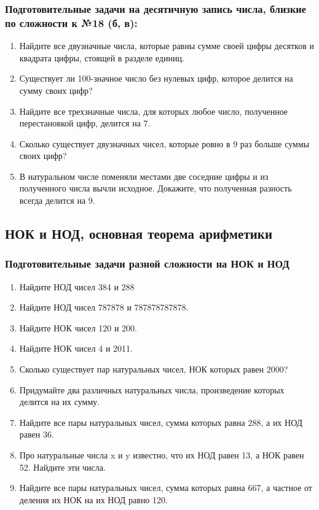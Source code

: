 \documentclass[12pt]{article}
\begin{document}
\subsubsection*{Подготовительные задачи на десятичную запись числа, близкие по сложности к №18 (б, в):}
 \begin{enumerate}[start=1,label={\itshape\bfseries \arabic*.}]
	\item Найдите все двузначные числа, которые равны сумме своей цифры десятков и квадрата цифры, стоящей в разделе единиц.
	\item Существует ли 100-значное число без нулевых цифр, которое делится на сумму своих цифр?
	\item Найдите все трехзначные числа, для которых любое число, полученное перестановкой цифр, делится на 7.
	\item Сколько существует двузначных чисел, которые ровно в 9 раз больше суммы своих цифр?
	\item В натуральном числе поменяли местами две соседние цифры и из полученного числа вычли исходное. Докажите, что полученная разность всегда делится на 9.
\end{enumerate}







\subsection{НОК и НОД, основная теорема арифметики}

\subsubsection*{Подготовительные задачи разной сложности на НОК и НОД}
 \begin{enumerate}[start=1,label={\itshape\bfseries \arabic*.}]
	\item Найдите НОД чисел 384 и 288
	\item Найдите НОД чисел 787878 и 787878787878.
	\item Найдите НОК чисел 120 и 200.
	\item Найдите НОК чисел 4 и 2011.
	\item Сколько существует пар натуральных чисел, НОК которых равен 2000?
	\item Придумайте два различных натуральных числа, произведение которых делится на их сумму.
	\item Найдите все пары натуральных чисел, сумма которых равна 288, а их НОД равен 36.
	\item Про натуральные числа x и y известно, что их НОД равен 13, а НОК равен 52. Найдите эти числа.
	\item Найдите все пары натуральных чисел, сумма которых равна 667, а частное от деления их НОК на их НОД равно 120.
\end{enumerate}
\end{document}
